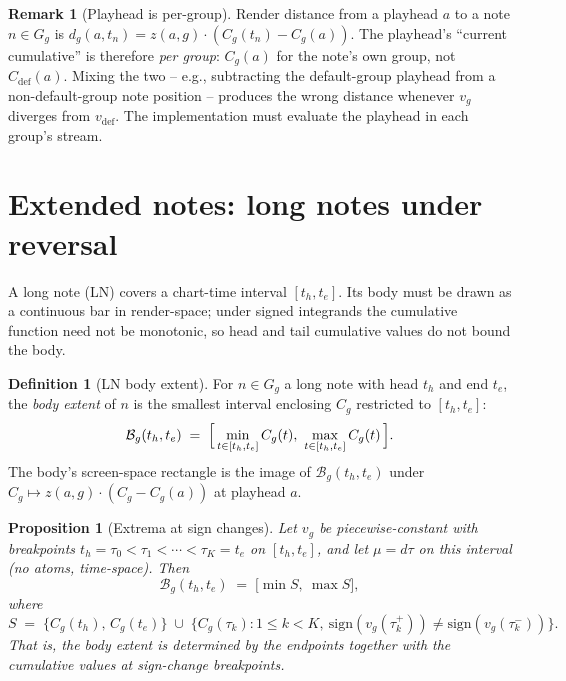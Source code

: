 \documentclass[11pt]{article}
\newtheorem{proposition}[theorem]{Proposition}
\theoremstyle{definition}
\newtheorem{definition}[theorem]{Definition}
\newtheorem{remark}[theorem]{Remark}
\begin{document}
\begin{remark}[Playhead is per-group]
\label{rem:playhead-per-group}
Render distance from a playhead $a$ to a note $n \in G_g$ is
$d_g(a, t_n) = z(a, g) \cdot (C_g(t_n) - C_g(a))$. The playhead's
``current cumulative'' is therefore \emph{per group}: $C_g(a)$ for the
note's own group, not $C_{\mathrm{def}}(a)$. Mixing the two -- e.g.,
subtracting the default-group playhead from a non-default-group note
position -- produces the wrong distance whenever $v_g$ diverges from
$v_{\mathrm{def}}$. The implementation must evaluate the playhead in
each group's stream.
\end{remark}

\section{Extended notes: long notes under reversal}
\label{sec:long-notes}

A long note (LN) covers a chart-time interval $[t_h, t_e]$. Its body
must be drawn as a continuous bar in render-space; under signed
integrands the cumulative function need not be monotonic, so head and
tail cumulative values do not bound the body.

\begin{definition}[LN body extent]
\label{def:body-extent}
For $n \in G_g$ a long note with head $t_h$ and end $t_e$, the
\emph{body extent} of $n$ is the smallest interval enclosing $C_g$
restricted to $[t_h, t_e]$:
\begin{equation}
\label{eq:body-extent}
\mathcal{B}_g(t_h, t_e)
\;=\; \Bigl[\, \min_{t \in [t_h, t_e]} C_g(t),\ \max_{t \in [t_h, t_e]} C_g(t)\,\Bigr].
\end{equation}
The body's screen-space rectangle is the image of $\mathcal{B}_g(t_h, t_e)$
under $C_g \mapsto z(a, g) \cdot (C_g - C_g(a))$ at playhead $a$.
\end{definition}

\begin{proposition}[Extrema at sign changes]
\label{prop:body-extrema}
Let $v_g$ be piecewise-constant with breakpoints
$t_h = \tau_0 < \tau_1 < \cdots < \tau_K = t_e$ on $[t_h, t_e]$, and
let $\mu = d\tau$ on this interval (no atoms, time-space). Then
\begin{equation}
\label{eq:hull-vertices}
\mathcal{B}_g(t_h, t_e)
\;=\; \bigl[\min S,\ \max S\bigr],
\end{equation}
where
\[
S \;=\; \{C_g(t_h),\, C_g(t_e)\}
\;\cup\; \{ C_g(\tau_k) : 1 \leq k < K,\ \mathrm{sign}(v_g(\tau_k^+)) \neq \mathrm{sign}(v_g(\tau_k^-)) \}.
\]
That is, the body extent is determined by the endpoints together with
the cumulative values at sign-change breakpoints.
\end{proposition}
\end{document}
